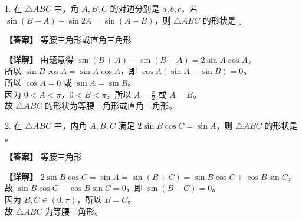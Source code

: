 \documentclass[UTF8,10pt,aspectratio=169]{ctexbeamer}
\begin{document}
	
	\begin{frame}
		1. 在 $\triangle ABC$ 中，角 $A, B, C$ 的对边分别是 $a, b, c$，若 $\sin(B+A) - \sin 2A = \sin(A-B)$，则 $\triangle ABC$ 的形状是 \underline{\hspace{2cm}}。
		
		\vspace{0.5cm}
		\pause
		\textbf{【答案】} 等腰三角形或直角三角形
		
		\vspace{0.2cm}
		\textbf{【详解】} 由题意得 $\sin(B+A) + \sin(B-A) = 2\sin A\cos A$，\\
		所以 $\sin B\cos A = \sin A\cos A$，即 $\cos A(\sin A - \sin B) = 0$。\\
		所以 $\cos A = 0$ 或 $\sin A = \sin B$。\\
		因为 $0 < A < \pi$，$0 < B < \pi$，所以 $A = \frac{\pi}{2}$ 或 $A = B$。\\
		故 $\triangle ABC$ 的形状为等腰三角形或直角三角形。
	\end{frame}
	
	\begin{frame}
		2. 在 $\triangle ABC$ 中，内角 $A, B, C$ 满足 $2\sin B \cos C = \sin A$，则 $\triangle ABC$ 的形状是 \underline{\hspace{2cm}}。
		
		\vspace{0.5cm}
		\pause
		\textbf{【答案】} 等腰三角形
		
		\vspace{0.2cm}
		\textbf{【详解】} $2\sin B\cos C = \sin A = \sin(B+C) = \sin B\cos C + \cos B\sin C$，\\
		故 $\sin B\cos C - \cos B\sin C = 0$，即 $\sin(B-C) = 0$。\\
		因为 $B, C \in (0, \pi)$，所以 $B = C$。\\
		故 $\triangle ABC$ 为等腰三角形。
	\end{frame}
	
\end{document}
